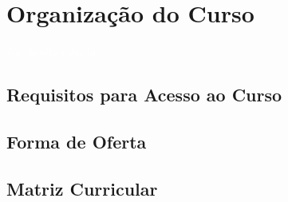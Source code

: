 \documentclass[11pt,fleqn]{book} %
\begin{document}


\chapter{Organização do Curso}\label{organizacao}
\vspace{6em}
\begin{flushright}
	\textit{\textcolor{white}{Um bonita citação...}}
\end{flushright}
\vspace{12em}

\section{Requisitos para Acesso ao Curso}


\section{Forma de Oferta}\label{carga}


\section{Matriz Curricular}\label{matriz}

\end{document}
